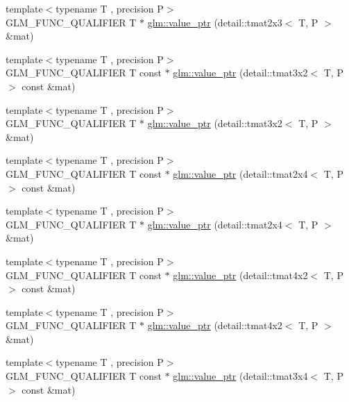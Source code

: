 \begin{DoxyCompactItemize}
\item 
{\footnotesize template$<$typename T , precision P$>$ }\\G\+L\+M\+\_\+\+F\+U\+N\+C\+\_\+\+Q\+U\+A\+L\+I\+F\+I\+ER T $\ast$ \hyperlink{group__gtc__type__ptr_gaaba8179ff5559d8b4493499313eb7a02}{glm\+::value\+\_\+ptr} (detail\+::tmat2x3$<$ T, P $>$ \&mat)
\item 
{\footnotesize template$<$typename T , precision P$>$ }\\G\+L\+M\+\_\+\+F\+U\+N\+C\+\_\+\+Q\+U\+A\+L\+I\+F\+I\+ER T const $\ast$ \hyperlink{group__gtc__type__ptr_gaf8edbe29063a5b8221fc8afcb6af224d}{glm\+::value\+\_\+ptr} (detail\+::tmat3x2$<$ T, P $>$ const \&mat)
\item 
{\footnotesize template$<$typename T , precision P$>$ }\\G\+L\+M\+\_\+\+F\+U\+N\+C\+\_\+\+Q\+U\+A\+L\+I\+F\+I\+ER T $\ast$ \hyperlink{group__gtc__type__ptr_gae2e604002202417c7156db3deeb1301d}{glm\+::value\+\_\+ptr} (detail\+::tmat3x2$<$ T, P $>$ \&mat)
\item 
{\footnotesize template$<$typename T , precision P$>$ }\\G\+L\+M\+\_\+\+F\+U\+N\+C\+\_\+\+Q\+U\+A\+L\+I\+F\+I\+ER T const $\ast$ \hyperlink{group__gtc__type__ptr_ga7b738eac576043c00c39bda2fc515d7b}{glm\+::value\+\_\+ptr} (detail\+::tmat2x4$<$ T, P $>$ const \&mat)
\item 
{\footnotesize template$<$typename T , precision P$>$ }\\G\+L\+M\+\_\+\+F\+U\+N\+C\+\_\+\+Q\+U\+A\+L\+I\+F\+I\+ER T $\ast$ \hyperlink{group__gtc__type__ptr_ga59b17271f4f487e556383b715f9b8534}{glm\+::value\+\_\+ptr} (detail\+::tmat2x4$<$ T, P $>$ \&mat)
\item 
{\footnotesize template$<$typename T , precision P$>$ }\\G\+L\+M\+\_\+\+F\+U\+N\+C\+\_\+\+Q\+U\+A\+L\+I\+F\+I\+ER T const $\ast$ \hyperlink{group__gtc__type__ptr_ga73acc0dbfeeb9e6c09df1f79fd990b84}{glm\+::value\+\_\+ptr} (detail\+::tmat4x2$<$ T, P $>$ const \&mat)
\item 
{\footnotesize template$<$typename T , precision P$>$ }\\G\+L\+M\+\_\+\+F\+U\+N\+C\+\_\+\+Q\+U\+A\+L\+I\+F\+I\+ER T $\ast$ \hyperlink{group__gtc__type__ptr_ga478c7dc470b36836ac5392e852fd2348}{glm\+::value\+\_\+ptr} (detail\+::tmat4x2$<$ T, P $>$ \&mat)
\item 
{\footnotesize template$<$typename T , precision P$>$ }\\G\+L\+M\+\_\+\+F\+U\+N\+C\+\_\+\+Q\+U\+A\+L\+I\+F\+I\+ER T const $\ast$ \hyperlink{group__gtc__type__ptr_ga233effe326542ae9657b8feac80e541f}{glm\+::value\+\_\+ptr} (detail\+::tmat3x4$<$ T, P $>$ const \&mat)

\end{DoxyCompactItemize}
